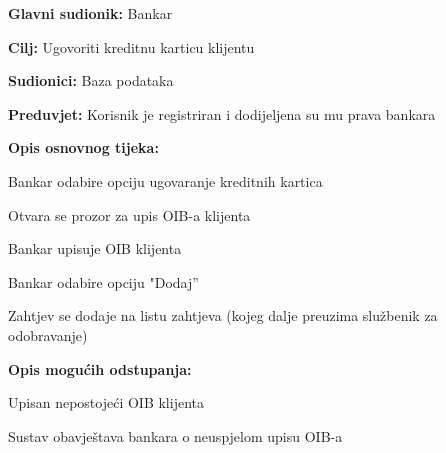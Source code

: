 \noindent {}
\begin{packed_item}

  \item \textbf{Glavni sudionik: }Bankar
  \item  \textbf{Cilj:} Ugovoriti kreditnu karticu klijentu
  \item  \textbf{Sudionici:} Baza podataka
  \item  \textbf{Preduvjet:} Korisnik je registriran i dodijeljena su mu prava bankara
  \item  \textbf{Opis osnovnog tijeka:}
  
  \item[] \begin{packed_enum}

    \item Bankar odabire opciju ugovaranje kreditnih kartica
    \item Otvara se prozor za upis OIB-a klijenta
    \item Bankar upisuje OIB klijenta
    \item Bankar odabire  opciju "Dodaj”
    \item Zahtjev se dodaje na listu zahtjeva (kojeg dalje preuzima službenik za odobravanje) 
  \end{packed_enum}
  
  \item  \textbf{Opis mogućih odstupanja:}
  
  \item[] \begin{packed_item}

    \item[2.a] Upisan nepostojeći OIB klijenta
    \item[] \begin{packed_enum}
      
      \item Sustav obavještava bankara o neuspjelom upisu OIB-a
      
    \end{packed_enum}
    
  \end{packed_item}
\end{packed_item}

